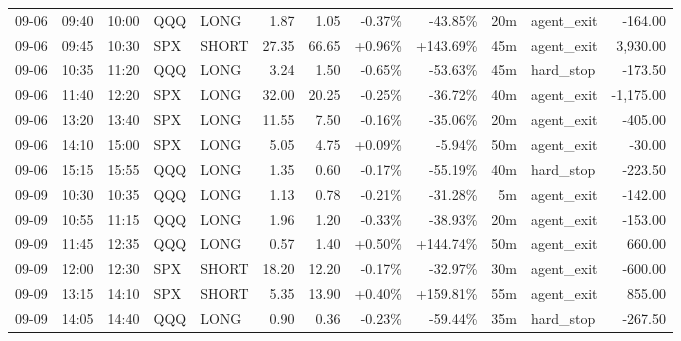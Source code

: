 \documentclass[11pt,a4paper,twoside]{article}
\begin{document}
\begin{center}
\begin{longtable}{>{\color{txtmain}}l l l l l r r r r r >{\color{txtmain}}l r}
09-06 & 09:40 & 10:00 & QQQ & LONG & 1.87 & 1.05 & \textcolor{lossred}{-0.37\%} & \textcolor{lossred}{-43.85\%} & 20m & agent\_exit & \textcolor{lossred}{-164.00} \\
09-06 & 09:45 & 10:30 & SPX & SHORT & 27.35 & 66.65 & \textcolor{wingreen}{+0.96\%} & \textcolor{wingreen}{+143.69\%} & 45m & agent\_exit & \textcolor{wingreen}{3,930.00} \\
09-06 & 10:35 & 11:20 & QQQ & LONG & 3.24 & 1.50 & \textcolor{lossred}{-0.65\%} & \textcolor{lossred}{-53.63\%} & 45m & hard\_stop & \textcolor{lossred}{-173.50} \\
09-06 & 11:40 & 12:20 & SPX & LONG & 32.00 & 20.25 & \textcolor{lossred}{-0.25\%} & \textcolor{lossred}{-36.72\%} & 40m & agent\_exit & \textcolor{lossred}{-1,175.00} \\
09-06 & 13:20 & 13:40 & SPX & LONG & 11.55 & 7.50 & \textcolor{lossred}{-0.16\%} & \textcolor{lossred}{-35.06\%} & 20m & agent\_exit & \textcolor{lossred}{-405.00} \\
09-06 & 14:10 & 15:00 & SPX & LONG & 5.05 & 4.75 & \textcolor{wingreen}{+0.09\%} & \textcolor{lossred}{-5.94\%} & 50m & agent\_exit & \textcolor{lossred}{-30.00} \\
09-06 & 15:15 & 15:55 & QQQ & LONG & 1.35 & 0.60 & \textcolor{lossred}{-0.17\%} & \textcolor{lossred}{-55.19\%} & 40m & hard\_stop & \textcolor{lossred}{-223.50} \\
09-09 & 10:30 & 10:35 & QQQ & LONG & 1.13 & 0.78 & \textcolor{lossred}{-0.21\%} & \textcolor{lossred}{-31.28\%} & 5m & agent\_exit & \textcolor{lossred}{-142.00} \\
09-09 & 10:55 & 11:15 & QQQ & LONG & 1.96 & 1.20 & \textcolor{lossred}{-0.33\%} & \textcolor{lossred}{-38.93\%} & 20m & agent\_exit & \textcolor{lossred}{-153.00} \\
09-09 & 11:45 & 12:35 & QQQ & LONG & 0.57 & 1.40 & \textcolor{wingreen}{+0.50\%} & \textcolor{wingreen}{+144.74\%} & 50m & agent\_exit & \textcolor{wingreen}{660.00} \\
09-09 & 12:00 & 12:30 & SPX & SHORT & 18.20 & 12.20 & \textcolor{lossred}{-0.17\%} & \textcolor{lossred}{-32.97\%} & 30m & agent\_exit & \textcolor{lossred}{-600.00} \\
09-09 & 13:15 & 14:10 & SPX & SHORT & 5.35 & 13.90 & \textcolor{wingreen}{+0.40\%} & \textcolor{wingreen}{+159.81\%} & 55m & agent\_exit & \textcolor{wingreen}{855.00} \\
09-09 & 14:05 & 14:40 & QQQ & LONG & 0.90 & 0.36 & \textcolor{lossred}{-0.23\%} & \textcolor{lossred}{-59.44\%} & 35m & hard\_stop & \textcolor{lossred}{-267.50} \\

\end{longtable}
\end{center}
\end{document}
